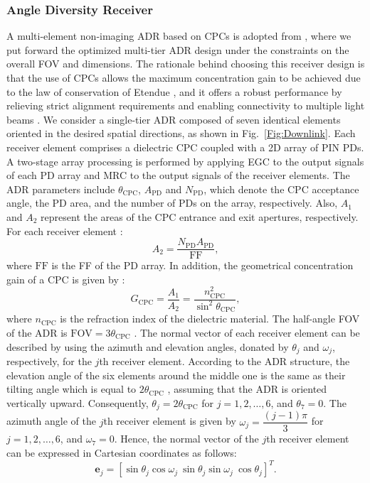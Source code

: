 \documentclass[lettersize,journal]{IEEEtran}
\begin{document}
\subsubsection{Angle Diversity Receiver}
A multi-element non-imaging \ac{ADR} based on \acp{CPC} is adopted from \cite{ESarbazi2022Design2}, where we put forward the optimized multi-tier \ac{ADR} design under the constraints on the overall \ac{FOV} and dimensions. The rationale behind choosing this receiver design is that the use of \acp{CPC} allows the maximum concentration gain to be achieved due to the law of conservation of Etendue \cite{RWinston2005}, and it offers a robust performance by relieving strict alignment requirements and enabling connectivity to multiple light beams \cite{ZChen2018angle,ESarbazi2023ARobust}. We consider a single-tier \ac{ADR} composed of seven identical elements oriented in the desired spatial directions, as shown in Fig.~\ref{Fig:Downlink}. Each receiver element comprises a dielectric \ac{CPC} coupled with a \ac{2D} array of PIN \acp{PD}. A two-stage array processing is performed by applying \ac{EGC} to the output signals of each \ac{PD} array and \ac{MRC} to the output signals of the receiver elements. The \ac{ADR} parameters include $\theta_\mathrm{CPC}$, $A_\mathrm{PD}$ and $N_\mathrm{PD}$, which denote the \ac{CPC} acceptance angle, the \ac{PD} area, and the number of \acp{PD} on the array, respectively. Also, $A_1$ and $A_2$ represent the areas of the \ac{CPC} entrance and exit apertures, respectively. For each receiver element \cite{ESarbazi2022Design2}:
\begin{equation}
A_2 = \dfrac{N_\mathrm{PD}A_\mathrm{PD}}{\mathrm{FF}},
\label{Eq:CPC_A2}
\end{equation} 
where $\mathrm{FF}$ is the \ac{FF} of the \ac{PD} array. In addition, the geometrical concentration gain of a \ac{CPC} is given by \cite{RWinston2005}:
%
\begin{equation}
    G_\mathrm{CPC} = \frac{A_1}{A_2} = \frac{n_\mathrm{CPC}^2}{\sin^2{\theta_\mathrm{CPC}}} ,
    \label{Eq:CPC_gain}
\end{equation}
%
where $n_\mathrm{CPC}$ is the refraction index of the dielectric material. The half-angle \ac{FOV} of the \ac{ADR} is $\mathrm{FOV} = 3\theta_\mathrm{CPC}$ \cite{ESarbazi2022Design2}. The normal vector of each receiver element can be described by using the azimuth and elevation angles, donated by $\theta_j$ and $\omega_j$, respectively, for the $j$th receiver element. According to the \ac{ADR} structure, the elevation angle of the six elements around the middle one is the same as their tilting angle which is equal to $2\theta_\mathrm{CPC}$ \cite{ESarbazi2022Design2}, assuming that the \ac{ADR} is oriented vertically upward. Consequently, $\theta_j=2\theta_\mathrm{CPC}$ for $j=1,2,\dots,6$, and $\theta_7=0$. The azimuth angle of the $j$th receiver element is given by $\omega_j=\dfrac{(j-1)\pi}{3}$ for $j=1,2,\dots,6$, and $\omega_7=0$. Hence, the normal vector of the $j$th receiver element can be expressed in Cartesian coordinates as follows:
\begin{equation}
    \mathbf{e}_j = [\sin\theta_j\cos\omega_j~\sin\theta_j\sin\omega_j~\cos\theta_j]^T.
    \label{Eq:e_j}
\end{equation}
\end{document}
